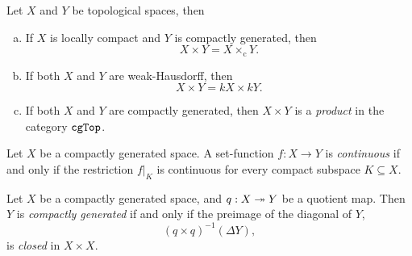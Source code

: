 \begin{lemma}
    \label{lem:relations-cartesian-and-k-product}
    Let \(X\) and \(Y\) be topological spaces, then
    \begin{enumerate}[(a)]\setlength\itemsep{0em}
        \item If \(X\) is locally compact and \(Y\) is compactly generated, then
              \[
                  X \times Y = X \times_{\text{c}} Y.
              \]
        \item If both \(X\) and \(Y\) are weak-Hausdorff, then
              \[
                  X \times Y = k X \times k Y.
              \]
        \item If both \(X\) and \(Y\) are compactly generated, then \(X \times Y\) is a
              \emph{product} in the category \({\texttt{cgTop}}\).
    \end{enumerate}
\end{lemma}

\begin{lemma}
    \label{lem:compactly-generated-cont-map-iff-restriction-to-cpct}
    Let \(X\) be a compactly generated space. A set-function \(f: X \to Y\) is
    \emph{continuous} if and only if the restriction \(f|_K\) is continuous for
    every compact subspace \(K \subseteq X\).
\end{lemma}

\begin{proposition}
    \label{prop:quotient-of-compactly-generated-space}
    Let \(X\) be a compactly generated space, and \(q: X \twoheadrightarrow Y\) be a quotient
    map. Then \(Y\) is \emph{compactly generated} if and only if the preimage of the
    diagonal of \(Y\),
    \[
        (q \times q)^{-1}(\Delta Y),
    \]
    is \emph{closed} in \(X \times X\).
\end{proposition}

